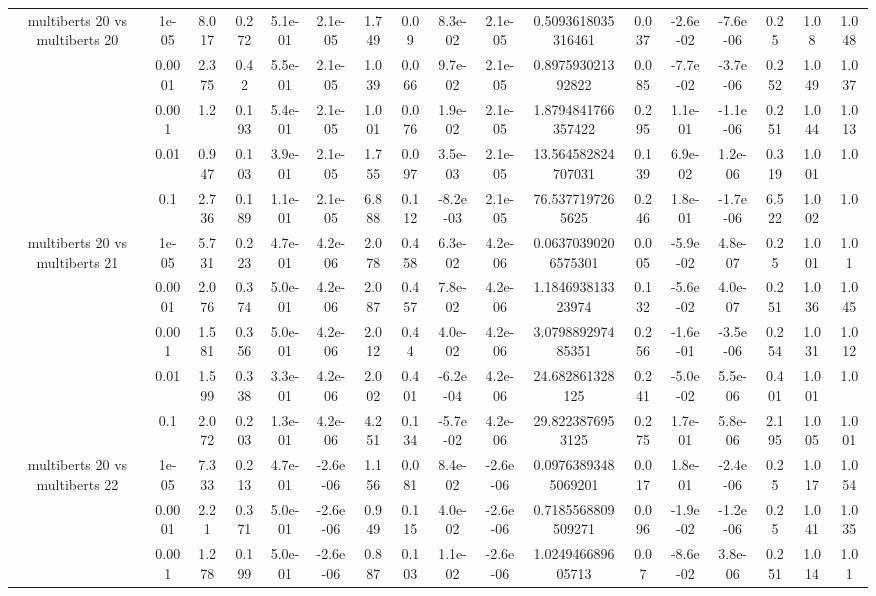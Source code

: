 \begin{tabular}{|c|c|c|c|c|c|c|c|c|c|c|c|c|c|c|c|c|}
\hline
\multirow{5}{*}{multiberts 20 vs multiberts 20} & 1e-05 & 8.017 & 0.272 & 5.1e-01 & 2.1e-05 & 1.749 & 0.09 & 8.3e-02 & 2.1e-05 & 0.5093618035316461 & 0.037 & -2.6e-02 & -7.6e-06 & 0.25 & 1.08 & 1.048 \\
 & 0.0001 & 2.375 & 0.42 & 5.5e-01 & 2.1e-05 & 1.039 & 0.066 & 9.7e-02 & 2.1e-05 & 0.897593021392822 & 0.085 & -7.7e-02 & -3.7e-06 & 0.252 & 1.049 & 1.037 \\
 & 0.001 & 1.2 & 0.193 & 5.4e-01 & 2.1e-05 & 1.001 & 0.076 & 1.9e-02 & 2.1e-05 & 1.8794841766357422 & 0.295 & 1.1e-01 & -1.1e-06 & 0.251 & 1.044 & 1.013 \\
 & 0.01 & 0.947 & 0.103 & 3.9e-01 & 2.1e-05 & 1.755 & 0.097 & 3.5e-03 & 2.1e-05 & 13.564582824707031 & 0.139 & 6.9e-02 & 1.2e-06 & 0.319 & 1.001 & 1.0 \\
 & 0.1 & 2.736 & 0.189 & 1.1e-01 & 2.1e-05 & 6.888 & 0.112 & -8.2e-03 & 2.1e-05 & 76.5377197265625 & 0.246 & 1.8e-01 & -1.7e-06 & 6.522 & 1.002 & 1.0 \\
\hline
\multirow{5}{*}{multiberts 20 vs multiberts 21} & 1e-05 & 5.731 & 0.223 & 4.7e-01 & 4.2e-06 & 2.078 & 0.458 & 6.3e-02 & 4.2e-06 & 0.06370390206575301 & 0.005 & -5.9e-02 & 4.8e-07 & 0.25 & 1.001 & 1.01 \\
 & 0.0001 & 2.076 & 0.374 & 5.0e-01 & 4.2e-06 & 2.087 & 0.457 & 7.8e-02 & 4.2e-06 & 1.184693813323974 & 0.132 & -5.6e-02 & 4.0e-07 & 0.251 & 1.036 & 1.045 \\
 & 0.001 & 1.581 & 0.356 & 5.0e-01 & 4.2e-06 & 2.012 & 0.44 & 4.0e-02 & 4.2e-06 & 3.079889297485351 & 0.256 & -1.6e-01 & -3.5e-06 & 0.254 & 1.031 & 1.012 \\
 & 0.01 & 1.599 & 0.338 & 3.3e-01 & 4.2e-06 & 2.002 & 0.401 & -6.2e-04 & 4.2e-06 & 24.682861328125 & 0.241 & -5.0e-02 & 5.5e-06 & 0.401 & 1.001 & 1.0 \\
 & 0.1 & 2.072 & 0.203 & 1.3e-01 & 4.2e-06 & 4.251 & 0.134 & -5.7e-02 & 4.2e-06 & 29.8223876953125 & 0.275 & 1.7e-01 & 5.8e-06 & 2.195 & 1.005 & 1.001 \\
\hline
\multirow{5}{*}{multiberts 20 vs multiberts 22} & 1e-05 & 7.333 & 0.213 & 4.7e-01 & -2.6e-06 & 1.156 & 0.081 & 8.4e-02 & -2.6e-06 & 0.09763893485069201 & 0.017 & 1.8e-01 & -2.4e-06 & 0.25 & 1.017 & 1.054 \\
 & 0.0001 & 2.21 & 0.371 & 5.0e-01 & -2.6e-06 & 0.949 & 0.115 & 4.0e-02 & -2.6e-06 & 0.7185568809509271 & 0.096 & -1.9e-02 & -1.2e-06 & 0.25 & 1.041 & 1.035 \\
 & 0.001 & 1.278 & 0.199 & 5.0e-01 & -2.6e-06 & 0.887 & 0.103 & 1.1e-02 & -2.6e-06 & 1.024946689605713 & 0.07 & -8.6e-02 & 3.8e-06 & 0.251 & 1.014 & 1.01 \\

\end{tabular}
